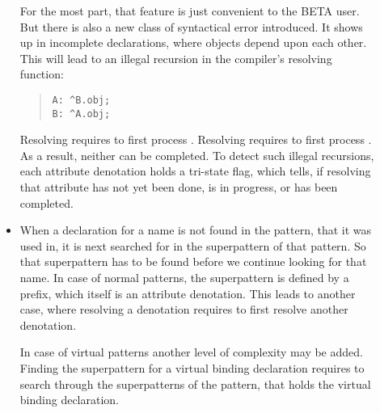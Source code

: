 \begin{description}
\begin{itemize}
	For the most part, that feature is just convenient to the
	BETA user.  But there is also a new class of syntactical
	error introduced.  It shows up in incomplete
	declarations, where objects depend upon each other.  This
	will lead to an illegal recursion in the compiler's
	resolving function:
	\begin{quote}\begin{verbatim}A: ^B.obj;
B: ^A.obj;
\end{verbatim}\end{quote}
	Resolving  requires to first process .
	Resolving  requires to first process .  As a
	result, neither can be completed.  To detect such illegal
	recursions, each attribute denotation holds a tri-state
	flag, which tells, if resolving that attribute has not
	yet been done, is in progress, or has been completed.
    \item When a declaration for a name is not found in the
	pattern, that it was used in, it is next searched for in
	the superpattern of that pattern.  So that superpattern
	has to be found before we continue looking for that name.
	In case of normal patterns, the superpattern is defined
	by a prefix, which itself is an attribute denotation.
	This leads to another case, where resolving a denotation
	requires to first resolve another denotation.

	In case of virtual patterns another level of complexity
	may be added.  Finding the superpattern for a virtual
	binding declaration requires to search through the
	superpatterns of the pattern, that holds the virtual
	binding declaration.
    \end{itemize}


\end{description}
